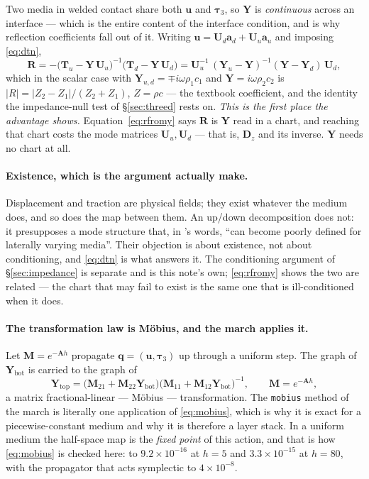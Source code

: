\documentclass[11pt,a4paper]{article}
\newcommand{\bA}{\mathbf{A}}
\newcommand{\bU}{\mathbf{U}}
\newcommand{\bq}{\mathbf{q}}
\newcommand{\bu}{\mathbf{u}}
\newcommand{\bta}{\boldsymbol{\tau}}
\newcommand{\bR}{\mathbf{R}}
\newcommand{\bY}{\mathbf{Y}}
\newcommand{\bM}{\mathbf{M}}
\begin{document}
Two media in welded contact share both $\bu$ and $\bta_3$, so $\bY$ is
\emph{continuous} across an interface --- which is the entire content of the
interface condition, and is why reflection coefficients fall out of it.  Writing
$\bu = \bU_d\mathbf{a}_d + \bU_u\mathbf{a}_u$ and imposing \eqref{eq:dtn},
\begin{equation}\label{eq:rfromy}
  \bR = -\bigl(\mathbf{T}_u - \bY\,\bU_u\bigr)^{-1}
         \bigl(\mathbf{T}_d - \bY\,\bU_d\bigr)
      = \bU_u^{-1}\,(\bY_u-\bY)^{-1}(\bY-\bY_d)\,\bU_d ,
\end{equation}
which in the scalar case with $\bY_{u,d}=\mp i\omega\rho_1c_1$ and
$\bY=i\omega\rho_2c_2$ is $|R| = |Z_2-Z_1|/(Z_2+Z_1)$, $Z=\rho c$ --- the
textbook coefficient, and the identity the impedance-null test of
\S\ref{sec:threed} rests on.  \emph{This is the first place the advantage shows.}
Equation~\eqref{eq:rfromy} says $\bR$ is $\bY$ read in a chart, and reaching that
chart costs the mode matrices $\bU_u,\bU_d$ --- that is, $\mathbf{D}_z$ and its
inverse.  $\bY$ needs no chart at all.

\paragraph{Existence, which is the argument \cite{haines2004} actually make.}
Displacement and traction are physical fields; they exist whatever the medium
does, and so does the map between them.  An up/down decomposition does not: it
presupposes a mode structure that, in \cite{haines2004}'s words, ``can become
poorly defined for laterally varying media''.  Their objection is about
existence, not about conditioning, and \eqref{eq:dtn} is what answers it.  The
conditioning argument of \S\ref{sec:impedance} is separate and is this note's
own; \eqref{eq:rfromy} shows the two are related --- the chart that may fail to
exist is the same one that is ill-conditioned when it does.

\paragraph{The transformation law is M\"obius, and the march applies it.}  Let
$\bM=e^{-\bA h}$ propagate $\bq=(\bu,\bta_3)$ up through a uniform step.  The
graph of $\bY_{\text{bot}}$ is carried to the graph of
\begin{equation}\label{eq:mobius}
  \bY_{\text{top}} = \bigl(\bM_{21}+\bM_{22}\bY_{\text{bot}}\bigr)
                     \bigl(\bM_{11}+\bM_{12}\bY_{\text{bot}}\bigr)^{-1},
  \qquad \bM = e^{-\bA h},
\end{equation}
a matrix fractional-linear --- M\"obius --- transformation.  The
\texttt{mobius} method of the march is literally one application of
\eqref{eq:mobius}, which is why it is exact for a piecewise-constant medium and
why it is therefore a layer stack.  In a uniform medium the
half-space map is the \emph{fixed point} of this action, and that is how
\eqref{eq:mobius} is checked here: to $9.2\times10^{-16}$ at $h=5$ and
$3.3\times10^{-15}$ at $h=80$, with the propagator that acts symplectic to
$4\times10^{-8}$.
\end{document}
